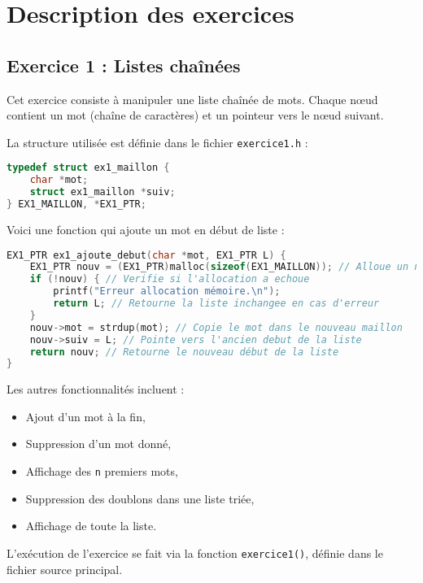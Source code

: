 \documentclass[a4paper,12pt]{article}
\begin{document}
\section{Description des exercices}

\subsection{Exercice 1 : Listes chaînées}
Cet exercice consiste à manipuler une liste chaînée de mots. Chaque nœud contient un mot (chaîne de caractères) et un pointeur vers le nœud suivant.

La structure utilisée est définie dans le fichier \texttt{exercice1.h} :

\begin{lstlisting}[language=C, caption={Structure de la liste chaînée}]
typedef struct ex1_maillon {
    char *mot;
    struct ex1_maillon *suiv;
} EX1_MAILLON, *EX1_PTR;
\end{lstlisting}

Voici une fonction qui ajoute un mot en début de liste :

\begin{lstlisting}[language=C, caption={Ajout d’un élément en tête de liste}]
EX1_PTR ex1_ajoute_debut(char *mot, EX1_PTR L) {
    EX1_PTR nouv = (EX1_PTR)malloc(sizeof(EX1_MAILLON)); // Alloue un nouveau maillon
    if (!nouv) { // Verifie si l'allocation a echoue
        printf("Erreur allocation mémoire.\n");
        return L; // Retourne la liste inchangee en cas d'erreur
    }
    nouv->mot = strdup(mot); // Copie le mot dans le nouveau maillon
    nouv->suiv = L; // Pointe vers l'ancien debut de la liste
    return nouv; // Retourne le nouveau début de la liste
}
\end{lstlisting}

Les autres fonctionnalités incluent :
\begin{itemize}
    \item Ajout d’un mot à la fin,
    \item Suppression d’un mot donné,
    \item Affichage des \texttt{n} premiers mots,
    \item Suppression des doublons dans une liste triée,
    \item Affichage de toute la liste.
\end{itemize}

L’exécution de l’exercice se fait via la fonction \texttt{exercice1()}, définie dans le fichier source principal.
\end{document}
